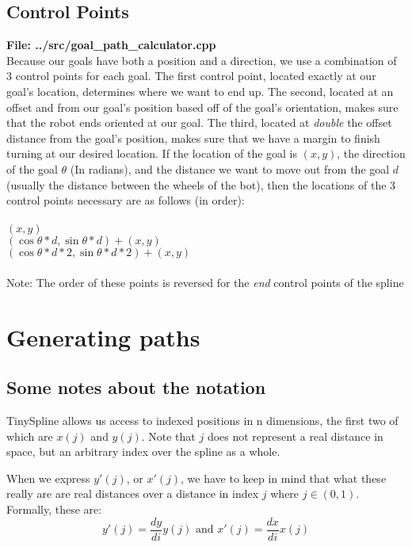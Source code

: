 \documentclass[12pt, english]{article}
\begin{document}
\subsection{Control Points}
\textbf{File: ../src/goal\_path\_calculator.cpp} \\
Because our goals have both a position and a direction, we use a combination of 3 control points for each goal. The first control point, located exactly at our goal's location, determines where we want to end up. The second, located at an offset and from our goal's position based off of the goal's orientation, makes sure that the robot ends oriented at our goal. The third, located at \textit{double} the offset distance from the goal's position, makes sure that we have a margin to finish turning at our desired location. If the location of the goal is $(x, y)$, the direction of the goal $\theta$ (In radians), and the distance we want to move out from the goal $d$ (usually the distance between the wheels of the bot), then the locations of the 3 control points necessary are as follows (in order): \\
\\
$(x, y)$ \\
$(\cos{\theta} * d, \sin{\theta} * d) + (x, y)$ \\
$(\cos{\theta} * d * 2, \sin{\theta} * d * 2) + (x, y)$ \\
\\
Note: The order of these points is reversed for the \textit{end} control points of the spline

\section{Generating paths}
\subsection{Some notes about the notation}
TinySpline allows us access to indexed positions in n dimensions, the first two of which are $x(j)$ and $y(j)$. Note that $j$ does not represent a real distance in space, but an arbitrary index over the spline as a whole. 

When we express $y'(j)$, or $x'(j)$, we have to keep in mind that what these really are are real distances over a distance in index $j$ where $j \in (0,1)$. Formally, these are:
\begin{equation}
	y'(j) = \frac{dy}{di} y(j) \text{  and  } x'(j) = \frac{dx}{di} x(j) 
\end{equation}
\end{document}
